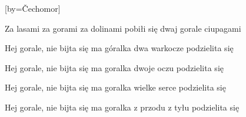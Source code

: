 [by={Čechomor}]

\beginchorus{}
Za lasami za gorami za dolinami
pobiłi się dwaj gorale ciupagami
\endchorus{}

\beginverse{}
\lrep{} Hej gorale, nie bijta się
ma góralka dwa warkocze podzielita się \rrep{}
\endverse{}

\beginchorus{}
\phantom{}
\endchorus{}

\beginverse{}
\lrep{} Hej gorale, nie bijta się
ma goralka dwoje oczu podzielita się \rrep{}
\endverse{}

\beginchorus{}
\phantom{}
\endchorus{}

\beginverse{}
\lrep{} Hej gorale, nie bijta się
ma goralka wielke serce podzielita się \rrep{}
\endverse{}

\beginchorus{}
\phantom{}
\endchorus{}

\beginverse{}
\lrep{} Hej gorale, nie bijta się
ma goralka z przodu z tyłu podzielita się \rrep{}
\endverse{}

\endsong{}
